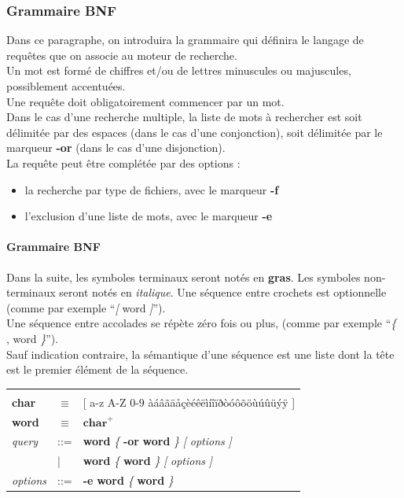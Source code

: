 \subsubsection{Grammaire BNF}
Dans ce paragraphe, on introduira la grammaire qui définira le langage de requêtes que on associe au moteur de recherche.\\

Un mot est formé de chiffres et/ou de lettres minuscules ou majuscules, possiblement accentuées.\\

Une requête doit obligatoirement commencer par un mot.\\

Dans le cas d'une recherche multiple, la liste de mots à rechercher est soit délimitée par 
des espaces (dans le cas d'une conjonction), soit délimitée par le marqueur \textbf{-or} (dans le
cas d'une disjonction).\\

La requête peut être complétée par des options :
\begin{itemize}
 \item la recherche par type de fichiers, avec le marqueur \textbf{-f}
 \item l'exclusion d'une liste de mots, avec le marqueur \textbf{-e}
 \end{itemize}

\paragraph{Grammaire BNF\\}
Dans la suite, les symboles terminaux seront notés en \textbf{gras}.
Les symboles non-terminaux seront notés en \textit{italique}. Une séquence entre crochets est optionnelle (comme par exemple ``\textit{[} word \textit{]}'').\\
Une séquence entre accolades se répète zéro fois ou plus, (comme par exemple ``\textit{\{} , word \textit{\}}'').\\
Sauf indication contraire, la sémantique d’une séquence est une liste dont la tête est le premier élément de la séquence.\\

\begin{tabular}{p{1.5cm} p{0.5cm} p{9cm} }
& & \\
\textbf{char} & $\equiv$ & [ a-z A-Z 0-9 àáâãäåçèéêëìíîïðòóôõöùúûüýÿ ]\\
\textbf{word} & $\equiv$ & $\textbf{char}^+$\\
\textit{query} & ::= & \textbf{word} \textit{\{} \textbf{-or} \textbf{word} \textit{\}} \textit{[} \textit{options} \textit{]}\\
& | & \textbf{word} \textit{\{} \textbf{word} \textit{\}} \textit{[} \textit{options} \textit{]}\\
\textit{options} & ::= & \textbf{-e} \textbf{word} \textit{\{} \textbf{word} \textit{\}}\\
\end{tabular}


